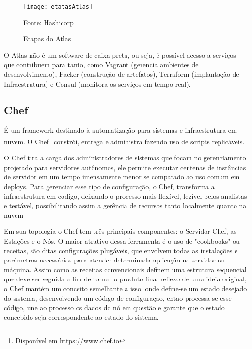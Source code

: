 \begin{figure}[htb]

	\centering
	\texttt{[image: etatasAtlas]}
	\caption{Etapas do Atlas}
	Fonte: Hashicorp\footnotemark
	\label{fig:etatasAtlas}


\end{figure}




O Atlas não é um software de caixa preta, ou seja, é possível acesso a serviços que contribuem para tanto, como Vagrant (gerencia ambientes de desenvolvimento), Packer (construção de artefatos), Terraform (implantação de Infraestrutura) e Consul (monitora os serviços em tempo real).

\subsection{Chef}

É um framework destinado à automatização para sistemas e infraestrutura em nuvem. O Chef\footnote{Disponível em https://www.chef.io} constrói, entrega e administra fazendo uso de scripts replicáveis.

O Chef tira a carga dos administradores de sistemas que focam no gerenciamento projetado para servidores autônomos, ele permite executar centenas de instâncias de servidor em um tempo imensamente menor se comparado ao uso comum em deploys. Para gerenciar esse tipo de configuração, o Chef, transforma a infraestrutura em código, deixando o processo mais flexível, legível pelos analistas e testável, possibilitando assim a gerência de recursos tanto localmente quanto na nuvem

Em sua topologia o Chef tem três principais componentes: o Servidor Chef, as Estações e o Nós. O maior atrativo dessa ferramenta é o uso de "cookbooks" ou receitas, são ditas configurações plugáveis, que envolvem todas as instalações e parâmetros necessários para atender determinada aplicação no servidor ou máquina. Assim como as receitas convencionais definem uma estrutura sequencial que deve ser seguida a fim de tornar o produto final reflexo de uma ideia original, o Chef mantém um conceito semelhante a isso, onde define-se um estado desejado do sistema, desenvolvendo um código de configuração, então processa-se esse código, une ao processo os dados do nó em questão e garante que o estado concebido seja correspondente ao estado do sistema. \cite{garzotto2006chef}

